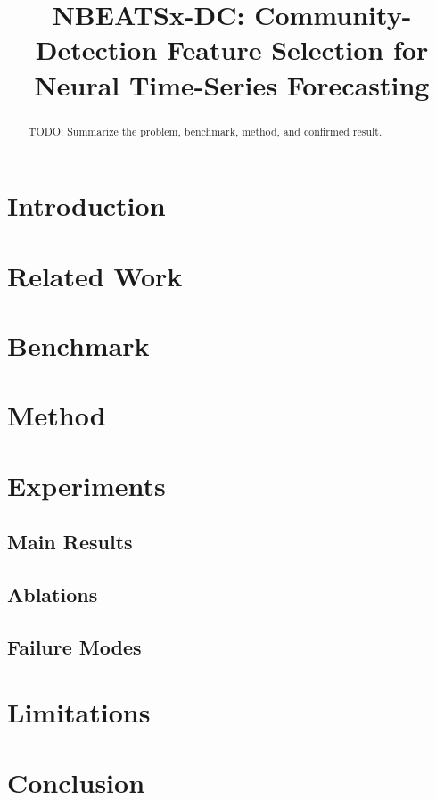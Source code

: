 \documentclass[10pt]{article}
\title{NBEATSx-DC: Community-Detection Feature Selection for Neural Time-Series Forecasting}
\author{}
\date{}
\begin{document}
\maketitle

\begin{abstract}
TODO: Summarize the problem, benchmark, method, and confirmed result.
\end{abstract}

\section{Introduction}

\section{Related Work}

\section{Benchmark}

\section{Method}

\section{Experiments}

\subsection{Main Results}

\subsection{Ablations}

\subsection{Failure Modes}

\section{Limitations}

\section{Conclusion}



\end{document}
